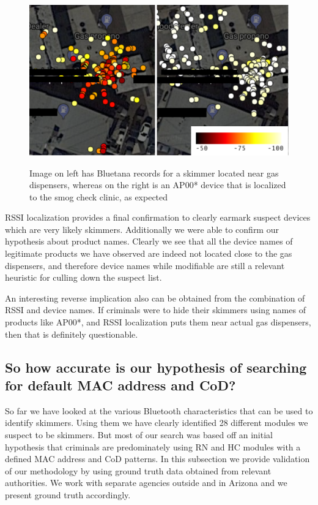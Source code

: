 \begin{figure}
\centering
\includegraphics[width=\linewidth]{fig/rssi_motivation.pdf}\\
\caption{
\label{fig:rssi_motivation}
Image on left has Bluetana records for a skimmer located near gas dispensers, whereas on the right is an AP00* device that is localized to the smog check clinic, as expected
}
\end{figure}

RSSI localization provides a final confirmation to clearly earmark suspect devices which are very likely skimmers. Additionally we were able to confirm our hypothesis about product names. Clearly we see that all the device names of legitimate products we have observed are indeed not located close to the gas dispensers, and therefore device names while modifiable are still a relevant heuristic for culling down the suspect list.

An interesting reverse implication also can be obtained from the combination of RSSI and device names. If criminals were to hide their skimmers using names of products like AP00*, and RSSI localization puts them near actual gas dispensers, then that is definitely questionable.


\subsection {So how accurate is our hypothesis of searching for default MAC address and CoD?}

So far we have looked at the various Bluetooth characteristics that can be used to identify skimmers. Using them we have clearly identified 28 different modules we suspect to be skimmers. But most of our search was based off an initial hypothesis that criminals are predominately using RN and HC modules with a defined MAC address and CoD patterns. In this subsection we provide validation of our methodology by using ground truth data obtained from relevant authorities. We work with separate agencies outside and in Arizona and we present ground truth accordingly.

